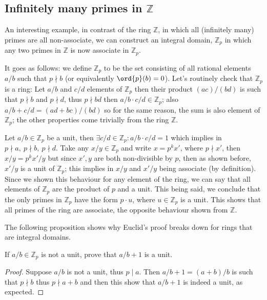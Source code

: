 \subsection{Infinitely many primes in \texorpdfstring{\(\mathbb{Z}\)}{Z}}



\begin{example}
    An interesting example, in contrast of the ring \(\mathbb{Z}\), in which all
    (infinitely many) primes are all non-associate, we can construct an integral
    domain, \(\mathbb{Z}_p\) in which any two primes in \(\mathbb{Z}\) is now
    associate in \(\mathbb{Z}_p\).

    It goes as follows: we define \(\mathbb{Z}_p\) to be the set consisting of
    all rational elements \(a/b\) such that  \(p \nmid b\) (or equivalently
    \(\ord{p}(b)=0\)). Let's routinely check that \(\mathbb{Z}_p\) is a ring: Let
    \(a/b\) and \(c/d\) elements of \(\mathbb{Z}_p\) then their product
    \((ac)/(bd)\) is such that  \(p \nmid b\) and  \(p \nmid d\), thus  \(p \nmid
    bd\) then \(a/b \cdot c/d \in \mathbb{Z}_p\); also \(a/b + c/d = (ad +
    bc)/(bd)\) so for the same reason, the sum is also element of
    \(\mathbb{Z}_p\); the other properties come trivially from the ring
    \(\mathbb{Z}\).

    Let \(a/b \in \mathbb{Z}_p\) be a unit, then \(\exists
    c/d \in \mathbb{Z}_p : a/b \cdot c/d = 1\) which implies in \(p \nmid a,\ p
    \nmid b,\ p \nmid d\). Take any \(x/y \in \mathbb{Z}_p\) and write \(x =
    p^k x'\), where  \(p \nmid x'\), then \(x/y = p^k x'/y\) but since \(x', y\)
    are both non-divisible by \(p\), then as shown before, \(x'/y\) is a unit of
    \(\mathbb{Z}_p\); this implies in \(x/y\) and  \(x'/y\) being associate (by
    definition). Since we shown this behaviour for any element of the ring, we
    can say that all elements of  \(\mathbb{Z}_p\) are the product of \(p\) and a
    unit. This being said, we conclude that the only primes in  \(\mathbb{Z}_p\)
    have the form \(p \cdot u\), where \(u \in \mathbb{Z}_p\) is a unit. This
    shows that all primes of the ring are associate, the opposite behaviour shown
    from \(\mathbb{Z}\).
\end{example}

The following proposition shows why Euclid's proof breaks down for rings that
are integral domains.
\begin{proposition}
    If \(a/b \in \mathbb{Z}_p\) is not a unit, prove that \(a/b + 1\) is a unit.
\end{proposition}

\begin{proof}
    Suppose \(a/b\) is not a unit, thus \(p \mid a\). Then \(a/b + 1 = (a+b)/b\)
    is such that \(p \nmid b\) thus  \(p \nmid a + b\) and then this show that
    \(a/b + 1\) is indeed a unit, as expected.
\end{proof}
